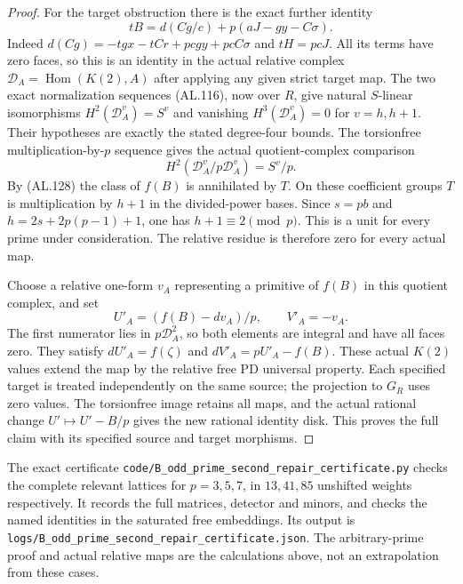 \begin{proof}
For the target obstruction there is the exact further identity
\[
                   tB=d(Cg/c)+p(aJ-gy-C\sigma).
 \tag{AL.128}
\]
Indeed $d(Cg)=-tgx-tCr+pcgy+pcC\sigma$ and $tH=pcJ$.
All its terms have zero faces, so this is an identity in
the actual relative complex $\mathcal D_A=\operatorname{Hom}(K(2),A)$
after applying any given strict target map.
The two exact normalization sequences (AL.116), now over $R$,
give natural $S$-linear isomorphisms
$H^2(\mathcal D_A^v)=S^v$ and vanishing
$H^3(\mathcal D_A^v)=0$ for $v=h,h+1$.
Their hypotheses are exactly the stated degree-four bounds.
The torsionfree multiplication-by-$p$ sequence gives the
actual quotient-complex comparison
\[
             H^2(\mathcal D_A^v/p\mathcal D_A^v)=S^v/p.
 \tag{AL.129}
\]
By (AL.128) the class of $f(B)$ is annihilated by $T$.
On these coefficient groups $T$ is multiplication by
$h+1$ in the divided-power bases. Since $s=pb$ and
$h=2s+2p(p-1)+1$, one has $h+1\equiv2\pmod p$.
This is a unit for every prime under consideration.
The relative residue is therefore zero for every actual map.

Choose a relative one-form $v_A$ representing a primitive
of $f(B)$ in this quotient complex, and set
\[
                   U'_A=(f(B)-dv_A)/p,\qquad V'_A=-v_A.
 \tag{AL.130}
\]
The first numerator lies in $p\mathcal D_A^2$, so both
elements are integral and have all faces zero. They satisfy
$dU'_A=f(\zeta)$ and $dV'_A=pU'_A-f(B)$.
These actual $K(2)$ values extend the map by the relative
free PD universal property. Each specified target is treated
independently on the same source; the projection to $G_R$
uses zero values. The torsionfree image retains all maps,
and the actual rational change $U'\mapsto U'-B/p$
gives the new rational identity disk. This proves the full
claim with its specified source and target morphisms.
\end{proof}

The exact certificate
\texttt{code/B\_odd\_prime\_second\_repair\_certificate.py}
checks the complete relevant lattices for $p=3,5,7$, in
$13,41,85$ unshifted weights respectively. It records the
full matrices, detector and minors, and checks the named
identities in the saturated free embeddings. Its output is
\texttt{logs/B\_odd\_prime\_second\_repair\_certificate.json}.
The arbitrary-prime proof and actual relative maps are
the calculations above, not an extrapolation from these cases.

